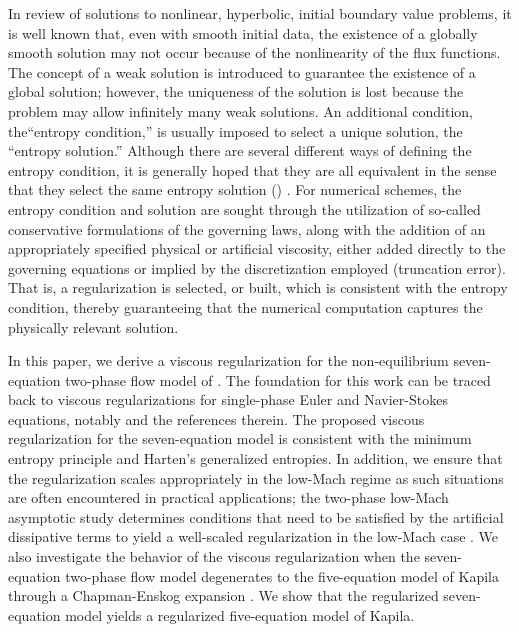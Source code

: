 \documentclass[preprint,10pt]{elsarticle}
\begin{document}
In review of solutions to nonlinear, hyperbolic, initial boundary value problems, it is well known that, even with smooth initial data, the existence of a 
globally smooth solution may not occur because of the nonlinearity of the flux functions. The concept of a weak
solution is introduced to guarantee the existence of a global solution; however, the uniqueness of the solution is lost because the problem may
allow infinitely many weak solutions.  An additional condition, the``entropy condition,'' is usually imposed to select a
unique solution, the ``entropy solution.'' %
Although there are several different ways of defining the entropy condition, it is generally hoped that they are all equivalent in the sense 
that they select the same entropy solution () .
For numerical schemes, the entropy condition and solution are sought through the utilization of so-called conservative formulations of the 
governing laws, along with the addition of an appropriately specified physical or artificial viscosity, either added directly to the governing 
equations or implied by the discretization employed (truncation error).  That is, a regularization is selected, or built, which is consistent with the 
entropy condition, thereby guaranteeing that the numerical computation captures the physically relevant solution.  

In this paper, we derive a viscous regularization for the non-equilibrium seven-equation two-phase flow model of \cite{SEM}. The foundation for this work 
can be traced back to viscous regularizations for single-phase Euler and Navier-Stokes equations, notably \cite{jlg} and the references therein. 
The proposed viscous regularization for the seven-equation model is consistent with the minimum entropy principle and Harten's generalized 
entropies. In addition, we ensure that the regularization scales appropriately in the low-Mach regime as such situations are often encountered 
in practical applications; the two-phase low-Mach asymptotic study determines conditions that need to be satisfied by the artificial dissipative 
terms to yield a well-scaled regularization in the low-Mach case \cite{Marco_paper_low_mach}. 
We also investigate the behavior of the viscous regularization when the seven-equation two-phase flow model degenerates to the five-equation 
model of Kapila \cite{Kapila_2001} through a Chapman-Enskog expansion \cite{dellacherie, GuillardMurrone2003}. We show 
that the regularized seven-equation model yields a regularized five-equation model of Kapila.
\end{document}
